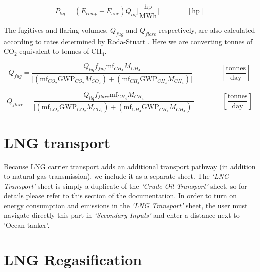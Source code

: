 \documentclass[11pt]{report}
\newcommand{\sheet}[1]{\textit{`{#1}'}}
\newcommand{\eqnunit}[1]{\quad\quad \scriptstyle{\left[\text{#1}\right]}}
\newcommand{\eqnunitfrac}[2]{\quad\quad \scriptstyle{\left[\frac{\text{#1}}{\text{#2}}\right]}}
\begin{document}
\begin{equation}
P_{liq} = \left(E_{comp} + E_{anc}\right) Q_{liq} \Big[\frac{\textrm{hp}}{\textrm{MWh}} \Big] \quad\quad\eqnunit{hp}
\end{equation}

The fugitives and flaring volumes, $Q_{fug}$ and $Q_{flare}$ respectively, are also calculated according to rates determined by Roda-Stuart \cite{RodaStuart2018}. Here we are converting tonnes of CO$_2$ equivalent to tonnes of CH$_4$.

\begin{equation}
Q_{fug} = \frac{Q_{liq} f_{fug} \textrm{mf}_{CH_4} M_{CH_4}}{\Big[\left(\textrm{mf}_{CO_2} \textrm{GWP}_{CO_2} M_{CO_2}\right) + \left(\textrm{mf}_{CH_4} \textrm{GWP}_{CH_4} M_{CH_4}\right)\Big]} \quad\quad\eqnunitfrac{tonnes}{day}
\end{equation}

\begin{equation}
Q_{flare} = \frac{Q_{liq} f_{flare} \textrm{mf}_{CH_4} M_{CH_4}}{\Big[\left(\textrm{mf}_{CO_2} \textrm{GWP}_{CO_2} M_{CO_2}\right) + \left(\textrm{mf}_{CH_4} \textrm{GWP}_{CH_4} M_{CH_4}\right)\Big]} \quad\quad\eqnunitfrac{tonnes}{day}
\end{equation}

\clearpage

\section{LNG transport}
\label{sec:lng_transport}

Because LNG carrier transport adds an additional transport pathway (in addition to natural gas transmission), we include it as a separate sheet. The \sheet{LNG Transport} sheet is simply a duplicate of the \sheet{Crude Oil Transport} sheet, so for details please refer to this section of the documentation.
In order to turn on energy consumption and emissions in the \sheet{LNG Transport} sheet, the user must navigate directly this part in \sheet{Secondary Inputs} and enter a distance next to 'Ocean tanker'.


\clearpage

\section{LNG Regasification}
\label{sec:lng_regassification}
\end{document}

